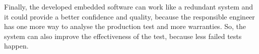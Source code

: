 \documentclass[11pt]{article} %
\begin{document}

Finally, the developed embedded software can work like a redundant system and it
could provide a better confidence and quality, because the responsible engineer
has one more way to analyse the production test and more warranties. So, the
system can also improve the effectiveness of the test, because less failed tests
happen.

\end{document}
